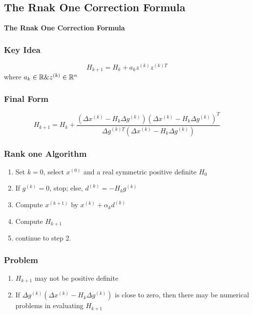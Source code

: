 
\begin{frame}
	\section{The Rnak One Correction Formula}
	\begin{center}
	\begin{Huge}
	\textbf{The Rnak One Correction Formula}
	\end{Huge}
	\end{center}
\end{frame}

\begin{frame}
	\frametitle{Key Idea}
	
	$$H_{k+1} = H_k + a_k z^{(k)}z^{(k)T}$$ where $a_k \in \mathbb{R} \& z^{(k)} \in \mathbb{R}^n$
\end{frame}


\begin{frame}
	\frametitle{Final Form}
	
	$$H_{k+1} = H_k + \dfrac{(\Delta x^{(k)} - H_k\Delta g^{(k)})(\Delta x^{(k)} - H_k \Delta g^{(k)})^T}{\Delta g^{(k)T} (\Delta x^{(k)} - H_k \Delta g^{(k)})}$$
\end{frame}


\begin{frame}
	\frametitle{Rank one Algorithm}
	\begin{enumerate}
	\item Set $k=0$, select $x^{(0)}$ and a real symmetric positive definite $H_0$
	\item If $g^{(k)} = 0$, stop; else, $d^{(k)} = -H_k g^{(k)}$
	\item Compute $x^{(k+1)}$ by $x^{(k)} + \alpha_k d^{(k)}$
	\item Compute $H_{k+1}$
	\item continue to step 2.
	\end{enumerate}
\end{frame}

\begin{frame}
	\frametitle{Problem}
	\begin{enumerate}
	\item $H_{k+1}$ may not be positive definite
	\item If $\Delta g^{(k)}(\Delta x^{(k)} - H_k \Delta g^{(k)})$ is close to zero, then there may be numerical problems in evaluating $H_{k+1}$
	\end{enumerate}
\end{frame}

